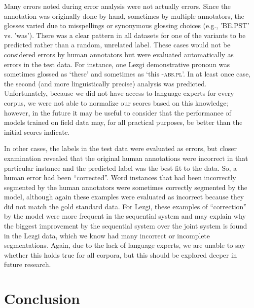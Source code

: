 Many errors noted during error analysis were not actually errors. Since the annotation was originally done by hand, sometimes by multiple annotators, the glosses varied due to misspellings or synonymous glossing choices (e.g., 'BE.PST' vs. 'was'). There was a clear pattern in all datasets for one of the variants to be predicted rather than a random, unrelated label. These cases would not be considered errors by human annotators but were evaluated automatically as errors in the test data. For instance, one Lezgi demonstrative pronoun was sometimes glossed as `these' and sometimes as `this \textsc{-abs.pl}'. In at least once case, the second (and more linguistically precise) analysis was predicted. Unfortunately, because we did not have access to language experts for every corpus, we were not able to normalize our scores based on this knowledge; however, in the future it may be useful to consider that the performance of models trained on field data may, for all practical purposes, be better than the initial scores indicate.

In other cases, the labels in the test data were evaluated as errors, but closer examination revealed that the original human annotations were incorrect in that particular instance and the predicted label was the best fit to the data. So, a human error had been ``corrected''. 
Word instances that had been incorrectly segmented by the human annotators were sometimes correctly segmented by the model, although again these examples were evaluated as incorrect because they did not match the gold standard data. For Lezgi, these examples of ``correction'' by the model were more frequent in the sequential system and may explain why the biggest improvement by the sequential system over the joint system is found in the Lezgi data, which we know had many incorrect or incomplete segmentations.  Again, due to the lack of language experts, we are unable to say whether this holds true for all corpora, but this should be explored deeper in future research.


\section{Conclusion}
\label{sec:sgconclusion}

